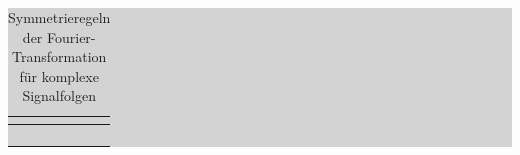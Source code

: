 \begin{table}[H]
\setlength{\arrayrulewidth}{.1em}
\caption{Symmetrieregeln der Fourier-Transformation f\"{u}r komplexe Signalfolgen}
\setlength{\fboxsep}{0pt}%
\colorbox{lightgray}{%
%
\begin{tabular}{| c | c |}
\hline
\parbox[c][0.35in][c]{3.3in}{\smallskip\centering\textbf{\selectfont{Folge x[k]}}} & 
\parbox[c][0.35in][c]{3.3in}{\smallskip\centering\textbf{\selectfont{Fourier-Transformierte X($\Omega$)}}}\\ \hline

\parbox[c][0.4in][c]{3.3in}{} & 
\parbox[c][0.4in][c]{3.3in}{}\\ \hline

\parbox[c][0.4in][c]{3.3in}{} & 
\parbox[c][0.4in][c]{3.3in}{}\\ \hline

\parbox[c][0.4in][c]{3.3in}{} & 
\parbox[c][0.4in][c]{3.3in}{}\\ \hline

\parbox[c][0.4in][c]{3.3in}{} & 
\parbox[c][0.4in][c]{3.3in}{}\\ \hline

\end{tabular}%
}
\label{tab:seventwo}
\end{table}


